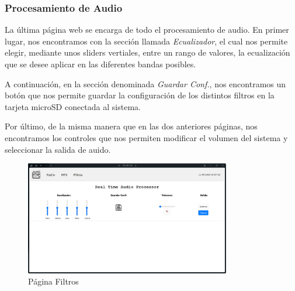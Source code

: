 \subsubsection{Procesamiento de Audio}

La última página web se encarga de todo el procesamiento de audio. En primer lugar, nos encontramos con la sección llamada \textit{Ecualizador}, el cual nos permite elegir, mediante unos sliders vertiales, entre un rango de valores, la ecualización que se desee aplicar en las diferentes bandas posibles.

A continuación, en la sección denominada \textit{Guardar Conf.}, nos encontramos un botón que nos permite guardar la configuración de los distintos filtros en la tarjeta microSD conectada al sistema.

Por último, de la misma manera que en las dos anteriores páginas, nos encontramos los controles que nos permiten modificar el volumen del sistema y seleccionar la salida de auido.

\begin{figure}[h]
    \centering
    \includegraphics[width=0.8\textwidth]{images/3/3-1/3-1-1-4/Pagina_Filtros.png}
    \caption{Página Filtros}
    \label{fig:3-1-1-4-Filtros}
\end{figure}
